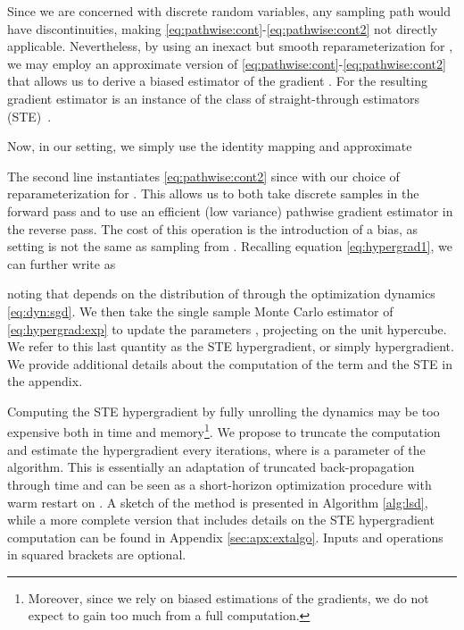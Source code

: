 \documentclass{article}
\begin{document}
Since we are concerned with discrete random variables, any sampling path would have discontinuities, making \eqref{eq:pathwise:cont}-\eqref{eq:pathwise:cont2} not directly applicable. 
Nevertheless, by using an inexact but smooth reparameterization for , we may employ an approximate version of \eqref{eq:pathwise:cont}-\eqref{eq:pathwise:cont2} that allows us to derive a biased estimator of the gradient .
For  the resulting gradient estimator is an instance of the class of 
straight-through estimators  (STE)~\cite{bengio2013estimating}.


Now, in our setting, we simply use the identity mapping 
 and approximate 

The second line instantiates \eqref{eq:pathwise:cont2} 
since
 with our choice of reparameterization for .
This allows us to both take discrete samples in the forward pass and to use an efficient (low variance) pathwise gradient estimator in the reverse pass. The cost of this operation is the introduction of a bias, as 
setting  is  not the same as sampling  from . Recalling equation \eqref{eq:hypergrad1}, we can further write  as

noting that  depends on the distribution of  through the optimization dynamics \eqref{eq:dyn:sgd}.
We then take the single sample Monte Carlo estimator of 
\eqref{eq:hypergrad:exp} to update the parameters , projecting 
on the unit hypercube. 
We refer to this last quantity as the STE hypergradient, or simply hypergradient. 
We provide additional details about the computation of the term  and the STE in the appendix.




Computing the STE hypergradient by fully unrolling the dynamics may be too expensive both in time and memory\footnote{Moreover, since we rely on biased estimations of the gradients, we do not expect to gain too much from a full computation.}. We propose to truncate the computation and estimate the hypergradient every  iterations, where  is a parameter of the algorithm. This is essentially an adaptation of truncated back-propagation through time \citep{werbos1990backpropagation, williams1990efficient} 
and can be seen as a short-horizon optimization procedure with warm restart on .
A sketch of the method is presented in Algorithm \ref{alg:lsd}, while a more complete version that includes details on the STE hypergradient computation can be found in Appendix \ref{sec:apx:extalgo}. Inputs and operations in squared brackets are optional.
\end{document}
